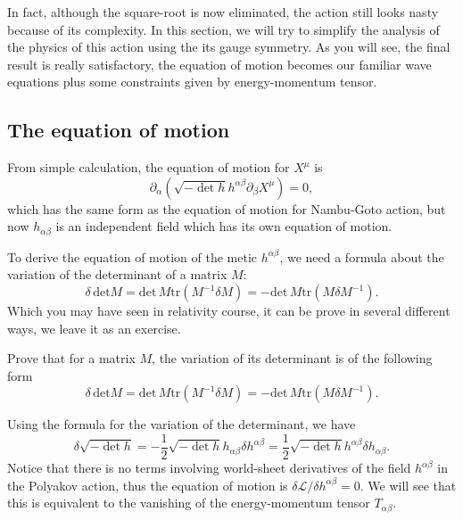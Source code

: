 \documentclass[graybox,envcountchap,sectrefs]{svmono}
\begin{document}
In fact, although the square-root is now eliminated, the action still looks nasty because of its complexity. In this section, we will try to simplify the analysis of the physics of this action using the its gauge symmetry. As you will see, the final result is really satisfactory, the equation of motion becomes our familiar wave equations plus some constraints given by energy-momentum tensor.


\subsection{The equation of motion}

From simple calculation, the equation of motion for $X^{\mu}$ is
\begin{equation}
\partial_{\alpha}(\sqrt{-\det h} h^{\alpha\beta}\partial_{\beta}X^{\mu})=0,	
\end{equation}
which has the same form as the equation of motion for Nambu-Goto action, but now $h_{\alpha\beta}$ is an independent field which has its own equation of motion.



To derive the equation of motion of the metic $h^{\alpha\beta}$, we need a formula about the variation of the determinant of a matrix $M$:
\begin{equation}
\delta\, \mathrm{det} M= \mathrm{det}\, M \mathrm{tr} (M^{-1}\delta M)=- \mathrm{det}\, M \mathrm{tr} (M\delta M^{-1}).
\end{equation}
Which you may have seen in relativity course, it can be prove in several different ways, we leave it as an exercise.
\begin{exercise}
Prove that for a matrix $M$, the variation of its determinant is of the following form
\begin{equation}
\delta\, \mathrm{det} M= \mathrm{det}\, M \mathrm{tr} (M^{-1}\delta M)=- \mathrm{det}\, M \mathrm{tr} (M\delta M^{-1}).
\end{equation}
\end{exercise}
Using the formula for the variation of the determinant, we have 
\begin{equation}
\delta \sqrt{-\det h}=-\frac{1}{2}\sqrt{-\det h} h_{\alpha\beta}\delta h^{\alpha\beta}=\frac{1}{2}\sqrt{-\det h} h^{\alpha\beta}\delta h_{\alpha\beta}.
\end{equation}
Notice that there is no terms involving world-sheet derivatives of the field $h^{\alpha\beta}$ in the Polyakov action, thus the equation of motion is $\delta \mathcal{L}/\delta h^{\alpha\beta}=0$. 
We will see that this is equivalent to the vanishing of the energy-momentum tensor $T_{\alpha\beta}$.
\end{document}
